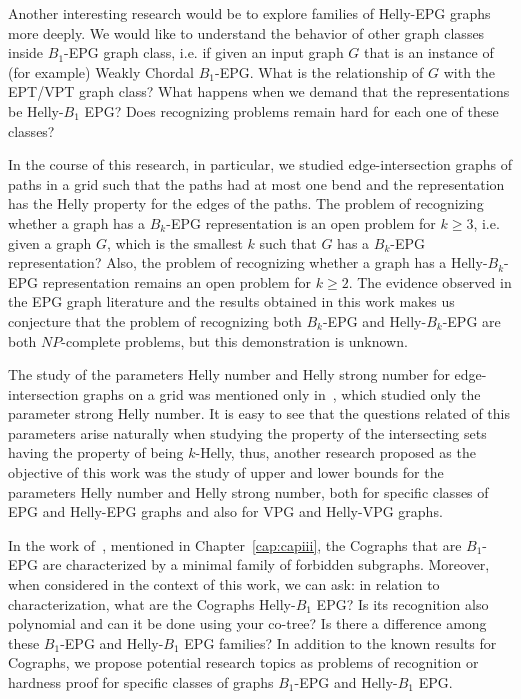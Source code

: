 Another interesting research would be to explore families of Helly-EPG graphs more deeply. We would like to understand the behavior of other graph classes inside $B_1$-EPG graph class, i.e. if given an  input graph $G$ that is an instance of (for example) Weakly Chordal $B_1$-EPG. What is the relationship of $G$ with the EPT/VPT graph class? What happens when we demand that the representations be Helly-$B_1$ EPG? Does  recognizing problems remain hard for each one of these classes?




In the course of this research, in particular, we studied edge-intersection graphs of paths in a grid such that the paths had at most one bend and the representation has the Helly property for the edges of the paths. The problem of recognizing whether a graph has a  $B_{k}$-EPG representation is an open problem for $k\geq 3$, i.e. given a graph $ G$, which is the smallest $k$ such that $ G $ has a $ B_{k}$-EPG representation? Also, the problem of recognizing whether a graph has a  Helly-$B_{k}$-EPG representation remains an open problem for $ k\geq 2$. The evidence observed in the EPG graph literature and the results obtained in this work makes us conjecture that the problem of recognizing both $B_{k}$-EPG and Helly-$B_{k}$-EPG  are both $NP$-complete problems, but this demonstration is unknown.

The study of the parameters Helly number and Helly strong number for edge-intersection graphs on a grid was mentioned only in~\cite{golumbic2009, golumbic2013}, which studied only the parameter strong Helly number. It is easy to see that the questions related of this parameters arise naturally when studying the property of the intersecting sets having the property of being $k$-Helly, thus, another research proposed as the objective of this work was the study of upper and lower bounds for the parameters Helly number and Helly strong number, both for specific classes of EPG and Helly-EPG graphs and also for VPG and Helly-VPG graphs.

In the work of~\citet{cohen2014}, mentioned in Chapter~\ref{cap:capiii}, the Cographs that are $B_1$-EPG are characterized by a minimal family of forbidden subgraphs. Moreover, when considered in the context of this work, we can ask: in relation to characterization, what are the Cographs Helly-$B_1$  EPG? Is its recognition also polynomial and can it be done using your co-tree? Is there a difference among these $B_1$-EPG and Helly-$B_1$  EPG families? In addition to the known results for Cographs, we propose potential research topics as problems of recognition or hardness proof  for specific classes of graphs $B_1$-EPG and Helly-$B_1$ EPG.


